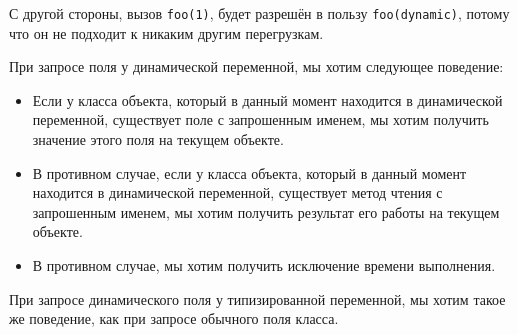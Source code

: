 С другой стороны, вызов \texttt{foo(1)}, будет разрешён в пользу \texttt{foo(dynamic)}, потому что он не подходит к никаким другим перегрузкам.

При запросе поля у динамической переменной, мы хотим следующее поведение:

\begin{itemize}
    \item Если у класса объекта, который в данный момент находится в динамической переменной, существует поле с запрошенным именем, мы хотим получить значение этого поля на текущем объекте.
    \item В противном случае, если у класса объекта, который в данный момент находится в динамической переменной, существует метод чтения с запрошенным именем, мы хотим получить результат его работы на текущем объекте.
    \item В противном случае, мы хотим получить исключение времени выполнения.
\end{itemize}

При запросе динамического поля у типизированной переменной, мы хотим такое же поведение, как при запросе обычного поля класса.